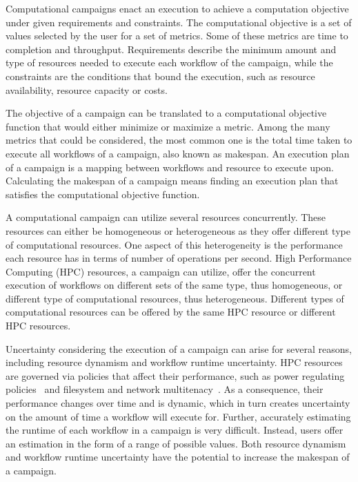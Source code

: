 \label{ch:campaigns}
Computational campaigns enact an execution to achieve a computation objective under given requirements and constraints.
The computational objective is a set of values selected by the user for a set of metrics.
Some of these metrics are time to completion and throughput.
Requirements describe the minimum amount and type of resources needed to execute each workflow of the campaign, while the constraints are the conditions that bound the execution, such as resource availability, resource capacity or costs.

The objective of a campaign can be translated to a computational objective function that would either minimize or maximize a metric.
Among the many metrics that could be considered, the most common one is the total time taken to execute all workflows of a campaign, also known as makespan.
An execution plan of a campaign is a mapping between workflows and resource to execute upon.
Calculating the makespan of a campaign means finding an execution plan that satisfies the computational objective function.

A computational campaign can utilize several resources concurrently.
These resources can either be homogeneous or heterogeneous as they offer different type of computational resources.
One aspect of this heterogeneity is the performance each resource has in terms of number of operations per second.
High Performance Computing (HPC) resources, a campaign can utilize, offer the concurrent execution of workflows on different sets of the same type, thus homogeneous, or different type of computational resources, thus heterogeneous.
Different types of computational resources can be offered by the same HPC resource or different HPC resources.

Uncertainty considering the execution of a campaign can arise for several reasons, including resource dynamism and workflow runtime uncertainty.
HPC resources are governed via policies that affect their performance, such as power regulating policies~\cite{inadomi2015analyzing} and filesystem and network  multitenacy~\cite{brown2018interference}.
As a consequence, their performance changes over time and is dynamic, which in turn creates uncertainty on the amount of time a workflow will execute for.
Further, accurately estimating the runtime of each workflow in a campaign is very difficult.
Instead, users offer an estimation in the form of a range of possible values.
Both resource dynamism and workflow runtime uncertainty have the potential to increase the makespan of a campaign.

